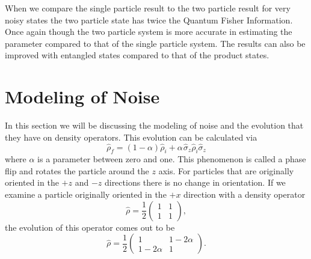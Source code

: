 \documentclass[twocolumn]{article}
\begin{document}
\newline
When we compare the single particle result to the two particle result for very noisy states the two particle state has twice the Quantum Fisher Information. Once again though the two particle system is more accurate in estimating the parameter compared to that of the single particle system. The results can also be improved with entangled states compared to that of the product states.
\section*{Modeling of Noise}
In this section we will be discussing the modeling of noise and the evolution that they have on density operators. This evolution can be calculated via
\begin{equation} \label{eq:80}
\hat{\rho}_f=(1-\alpha)\hat{\rho}_i+\alpha\hspace{1pt}\hat{\sigma}_z\hat{\rho}_i\hat{\sigma}_z
\end{equation}
where $\alpha$ is a parameter between zero and one. This phenomenon is called a phase flip and rotates the particle around the $z$ axis. For particles that are originally oriented in the $+z$ and $-z$ directions there is no change in orientation. If we examine a particle originally oriented in the $+x$ direction with a density operator 
\begin{equation} \label{eq:81}
\hat{\rho}=\frac{1}{2}
\begin{pmatrix}
1 & 1 \\
1 & 1
\end{pmatrix},
\end{equation}
the evolution of this operator comes out to be
\begin{equation} \label{eq:82}
\hat{\rho}=\frac{1}{2}
\begin{pmatrix}
1 & 1-2\alpha \\
1-2\alpha & 1
\end{pmatrix}.
\end{equation}
\end{document}
